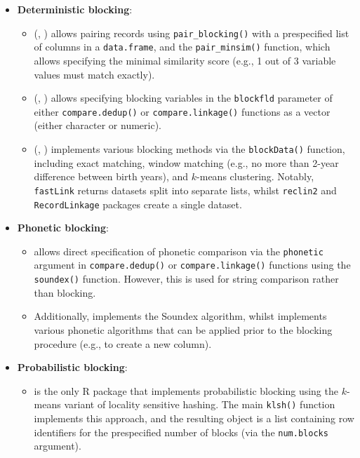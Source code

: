\begin{itemize}
\tightlist
\item
  \textbf{Deterministic blocking}:

  \begin{itemize}
  \tightlist
  \item
     (\citet{reclin2}, \citet{reclin2-rjournal}) allows pairing
    records using \texttt{pair\_blocking()} with a prespecified list of
    columns in a \texttt{data.frame}, and the \texttt{pair\_minsim()} function,
    which allows specifying the minimal similarity score (e.g., 1
    out of 3 variable values must match exactly).
  \item
     (\citet{RecordLinkage}, \citet{RecordLinkage-rjournal})
    allows specifying blocking variables in the \texttt{blockfld} parameter
    of either \texttt{compare.dedup()} or \texttt{compare.linkage()} functions as
    a vector (either character or numeric).
  \item
     (\citet{fastLink}, \citet{enamorado2019using}) implements
    various blocking methods via the \texttt{blockData()} function,
    including exact matching, window matching (e.g., no more than
    2-year difference between birth years), and \(k\)-means clustering.
    Notably, \texttt{fastLink} returns datasets split into separate lists,
    whilst \texttt{reclin2} and \texttt{RecordLinkage} packages create a single
    dataset.
  \end{itemize}
\item
  \textbf{Phonetic blocking}:

  \begin{itemize}
  \tightlist
  \item
     allows direct specification of phonetic
    comparison via the \texttt{phonetic} argument in \texttt{compare.dedup()} or
    \texttt{compare.linkage()} functions using the \texttt{soundex()} function.
    However, this is used for string comparison rather than
    blocking.
  \item
    Additionally,  \citep{stringdist} implements the
    Soundex algorithm, whilst  \citep{phonics} implements various phonetic algorithms that can be applied prior to the blocking procedure (e.g., to create a
    new column).
  \end{itemize}
\item
  \textbf{Probabilistic blocking}:

  \begin{itemize}
  \tightlist
  \item
     \citep{klsh} is the only R package that implements
    probabilistic blocking using the \(k\)-means variant of locality
    sensitive hashing. The main \texttt{klsh()} function implements this
    approach, and the resulting object is a list containing row
    identifiers for the prespecified number of blocks (via the
    \texttt{num.blocks} argument).
  \end{itemize}
\end{itemize}

